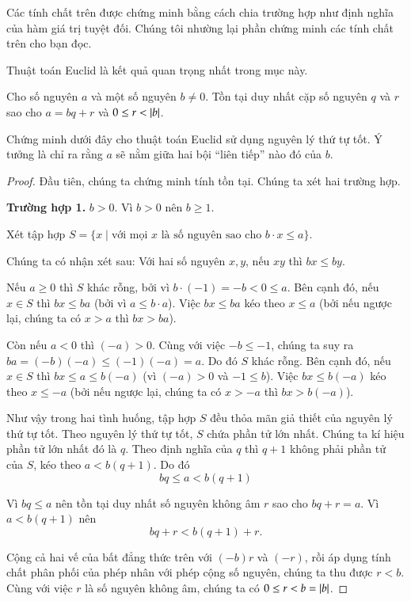 Các tính chất trên được chứng minh bằng cách chia trường hợp như định nghĩa của hàm giá trị tuyệt đối. Chúng tôi nhường lại phần chứng minh các tính chất trên cho bạn đọc.

Thuật toán Euclid là kết quả quan trọng nhất trong mục này.
\begin{theorem}
    Cho số nguyên $a$ và một số nguyên $b\ne 0$. Tồn tại duy nhất cặp số nguyên $q$ và $r$ sao cho $a = bq + r$ và $0\leq r < \left\vert{b}\right\vert$.
\end{theorem}

Chứng minh dưới đây cho thuật toán Euclid sử dụng nguyên lý thứ tự tốt. Ý tưởng là chỉ ra rằng $a$ sẽ nằm giữa hai bội ``liên tiếp'' nào đó của $b$.

\begin{proof}
    Đầu tiên, chúng ta chứng minh tính tồn tại. Chúng ta xét hai trường hợp.

    \textbf{Trường hợp 1.} $b > 0$. Vì $b > 0$ nên $b\geq 1$.

    Xét tập hợp $S = \{ x \mid \text{với mọi $x$ là số nguyên sao cho $b\cdot x\leq a$} \}$.

    Chúng ta có nhận xét sau: Với hai số nguyên $x, y$, nếu $xy$ thì $bx \leq by$.
    \bigskip

    Nếu $a\geq 0$ thì $S$ khác rỗng, bởi vì $b\cdot (-1) = -b < 0 \leq a$. Bên cạnh đó, nếu $x\in S$ thì $bx \leq ba$ (bởi vì $a\leq b\cdot a$). Việc $bx \leq ba$ kéo theo $x\leq a$ (bởi nếu ngược lại, chúng ta có $x > a$ thì $bx > ba$).

    Còn nếu $a < 0$ thì $(-a) > 0$. Cùng với việc $-b\leq -1$, chúng ta suy ra $ba = (-b)(-a)\leq (-1)(-a) = a$. Do đó $S$ khác rỗng. Bên cạnh đó, nếu $x\in S$ thì $bx \leq a\leq b(-a)$ (vì $(-a) > 0$ và $-1\leq b$). Việc $bx\leq b(-a)$ kéo theo $x\leq -a$ (bởi nếu ngược lại, chúng ta có $x > -a$ thì $bx > b(-a)$).

    Như vậy trong hai tình huống, tập hợp $S$ đều thỏa mãn giả thiết của nguyên lý thứ tự tốt. Theo nguyên lý thứ tự tốt, $S$ chứa phần tử lớn nhất. Chúng ta kí hiệu phần tử lớn nhất đó là $q$. Theo định nghĩa của $q$ thì $q+1$ không phải phần tử của $S$, kéo theo $a < b(q + 1)$. Do đó
    \[
        bq\leq a < b(q + 1)
    \]

    Vì $bq\leq a$ nên tồn tại duy nhất số nguyên không âm $r$ sao cho $bq + r = a$. Vì $a < b(q + 1)$ nên
    \[
        bq + r < b(q + 1) + r.
    \]

    Cộng cả hai vế của bất đẳng thức trên với $(-b)r$ và $(-r)$, rồi áp dụng tính chất phân phối của phép nhân với phép cộng số nguyên, chúng ta thu được $r < b$. Cùng với việc $r$ là số nguyên không âm, chúng ta có $0\leq r < b = \left\vert{b}\right\vert$.


\end{proof}
